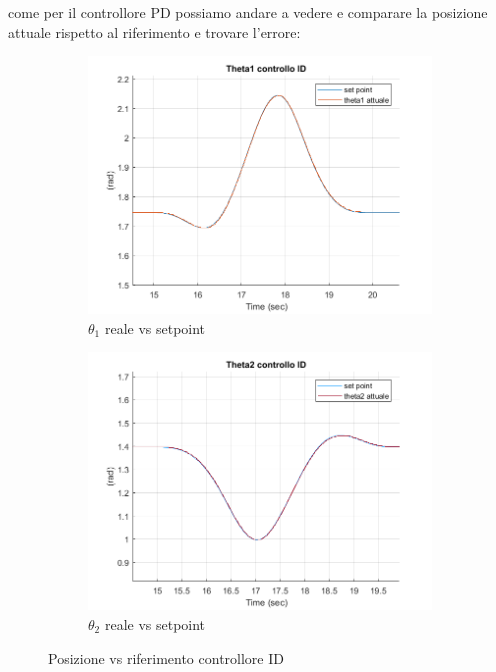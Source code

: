 come per il controllore PD possiamo andare a vedere e comparare la posizione attuale rispetto al riferimento e trovare l'errore:
\begin{figure}[!ht]
\begin{subfigure}{.53\textwidth}
  \centering
  \includegraphics[width=.9\linewidth]{Immagini/Traiettorie/Theta1ID}  
  \caption{$\theta_1$ reale vs setpoint}
  \label{fig:sub-id1}
\end{subfigure}
\begin{subfigure}{.53\textwidth}
  \centering
  \includegraphics[width=.9\linewidth]{Immagini/Traiettorie/Theta2ID}  
  \caption{$\theta_2$ reale vs setpoint}
  \label{fig:sub-pd2k}
\end{subfigure}
\caption{Posizione vs riferimento controllore ID}
\end{figure}

